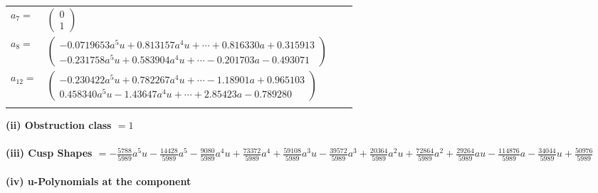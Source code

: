 \documentclass[1p]{elsarticle_modified}
\theoremstyle{definition}
\begin{document}
\begin{tabular}{m{7pt} m{180pt} m{7pt} m{180pt} }
\flushright $a_{7}=$&$\begin{pmatrix}0\\1\end{pmatrix}$ \\
\flushright $a_{8}=$&$\begin{pmatrix}-0.0719653 a^{5} u+0.813157 a^{4} u+\cdots+0.816330 a+0.315913\\-0.231758 a^{5} u+0.583904 a^{4} u+\cdots-0.201703 a-0.493071\end{pmatrix}$ \\
\flushright $a_{12}=$&$\begin{pmatrix}-0.230422 a^{5} u+0.782267 a^{4} u+\cdots-1.18901 a+0.965103\\0.458340 a^{5} u-1.43647 a^{4} u+\cdots+2.85423 a-0.789280\end{pmatrix}$\\&\end{tabular}
\flushleft \textbf{(ii) Obstruction class $= 1$}\\~\\
\flushleft \textbf{(iii) Cusp Shapes $= -\frac{5788}{5989} a^5 u-\frac{14428}{5989} a^5-\frac{9080}{5989} a^4 u+\frac{73372}{5989} a^4+\frac{59108}{5989} a^3 u-\frac{39572}{5989} a^3+\frac{20364}{5989} a^2 u+\frac{72864}{5989} a^2+\frac{29264}{5989} a u-\frac{114876}{5989} a-\frac{34044}{5989} u+\frac{50976}{5989}$}\\~\\
\newpage\renewcommand{\arraystretch}{1}
\flushleft \textbf{(iv) u-Polynomials at the component}\newline \\
\end{document}
